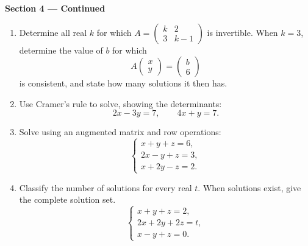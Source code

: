 \documentclass[11pt]{article}
\begin{document}
\newpage
\begin{center}{\large\textbf{Section 4 --- Continued}}\end{center}
\begin{enumerate}[leftmargin=*,itemsep=0pt,resume=chapterEleven]
  \item Determine all real $k$ for which
  $A=\begin{pmatrix}k&2\\3&k-1\end{pmatrix}$ is invertible.
  When $k=3$, determine the value of $b$ for which
  \[
    A\begin{pmatrix}x\\y\end{pmatrix}=\begin{pmatrix}b\\6\end{pmatrix}
  \]
  is consistent, and state how many solutions it then has.
  \par{}

  \item Use Cramer's rule to solve, showing the determinants:
  \[
    2x-3y=7,\qquad 4x+y=7.
  \]
  \par{}

  \item Solve using an augmented matrix and row operations:
  \[
    \begin{cases}
      x+y+z=6,\\
      2x-y+z=3,\\
      x+2y-z=2.
    \end{cases}
  \]
  \par{}

  \item Classify the number of solutions for every real $t$.
  When solutions exist, give the complete solution set.
  \[
    \begin{cases}
      x+y+z=2,\\
      2x+2y+2z=t,\\
      x-y+z=0.
    \end{cases}
  \]
  \par{}
\end{enumerate}
\end{document}
